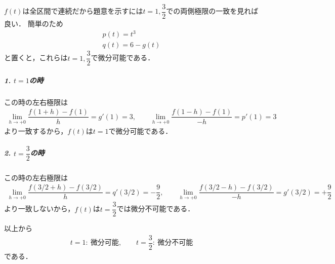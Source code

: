 \documentclass[../../main.tex]{subfiles}
\begin{document}
$f(t)$は全区間で連続だから題意を示すには$t=1,\dfrac{3}{2}$での両側極限の一致を見れば良い．
簡単のため
\begin{align}
  p(t) = t^3 \\
  q(t) = 6-g(t)
\end{align}
と置くと，これらは$t=1,\dfrac{3}{2}$で微分可能である．

\subparagraph{1. $t=1$の時}

この時の左右極限は
\begin{align}
  \lim_{h\to +0}\dfrac{f(1+h)-f(1)}{h} = g'(1)=3,
  \qquad
  \lim_{h\to +0}\dfrac{f(1-h)-f(1)}{-h} = p'(1)=3
\end{align}
より一致するから，$f(t)$は$t=1$で微分可能である．

\subparagraph{2. $t=\dfrac{3}{2}$の時}

この時の左右極限は
\begin{align}
  \lim_{h\to +0}\dfrac{f(3/2+h)-f(3/2)}{h} = q'(3/2)=-\dfrac{9}{2}, \qquad \lim_{h\to +0}\dfrac{f(3/2-h)-f(3/2)}{-h} = g'(3/2)=+\dfrac{9}{2}
\end{align}
より一致しないから，$f(t)$は$t=\dfrac{3}{2}$では微分不可能である．

以上から
\begin{align}
  t=1:\ \text{微分可能}, \qquad t=\dfrac{3}{2}:\ \text{微分不可能}
\end{align}
である．

\newpage
\end{document}
